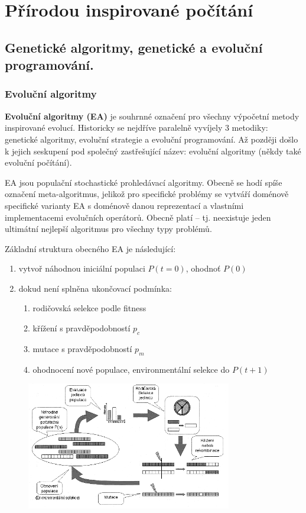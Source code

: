 \chapter{Přírodou inspirované počítání}
\section{Genetické algoritmy, genetické a evoluční programování.}
\subsection{Evoluční algoritmy}
\textbf{Evoluční algoritmy (EA)} je souhrnné označení pro všechny výpočetní metody inspirované evolucí. Historicky se nejdříve paralelně vyvíjely 3 metodiky: genetické algoritmy, evoluční strategie a evoluční programování. Až později došlo k jejich seskupení pod společný zastřešující název: evoluční algoritmy (někdy také evoluční počítání).

EA jsou populační stochastické prohledávací algoritmy. Obecně se hodí spíše označení meta-algoritmus, jelikož pro specifické problémy se vytváří doménově specifické varianty EA s doménově danou reprezentací a vlastními implementacemi evolučních operátorů. Obecně platí  -- tj. neexistuje jeden ultimátní nejlepší algoritmus pro všechny typy problémů.

Základní struktura obecného EA je následující:
\begin{enumerate}
	\leftskip 40pt
	\setlength{\itemsep}{0pt}
	\item vytvoř náhodnou iniciální populaci $P(t=0)$, ohodnoť $P(0)$
	\item dokud není splněna ukončovací podmínka:
	\begin{enumerate}
		\leftskip 40pt
		\setlength{\itemsep}{0pt}
		\item rodičovská selekce podle fitness
		\item křížení s pravděpodobností $p_c$
		\item mutace s pravděpodobností $p_m$
		\item ohodnocení nové populace, environmentální selekce do $P(t+1)$
	\end{enumerate}
\end{enumerate}
\begin{figure}[H]
	\centering
	\includegraphics[width=0.8\textwidth]{img/ea.png}
\end{figure}

